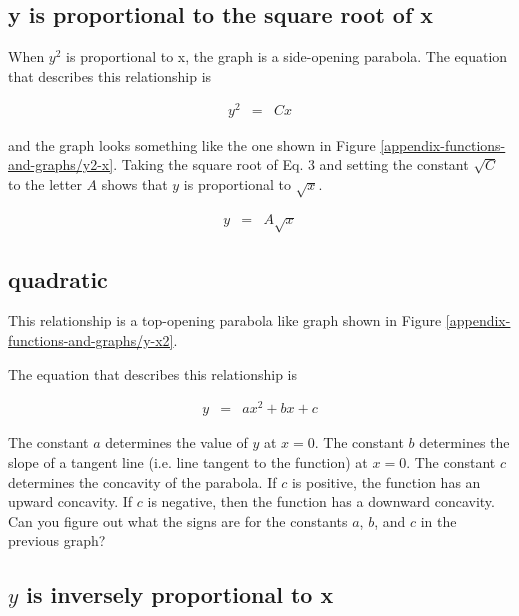 \subsection*{y is proportional to the square root of x}

When $y^2$ is proportional to x, the graph is a side-opening parabola.  The equation that describes this relationship is

\begin{eqnarray*}
	 y^2 & = & Cx
\end{eqnarray*}	 
 
and the graph looks something like the one shown in Figure \ref{appendix-functions-and-graphs/y2-x}. Taking the square root of Eq. 3  and setting the constant $\sqrt{C}$ to the letter $A$ shows that $y$ is proportional to $\sqrt{x}$.

\begin{eqnarray*}
	 y& = & A\sqrt{x}
\end{eqnarray*}	



\subsection*{quadratic}

This relationship is a top-opening parabola like graph shown in Figure \ref{appendix-functions-and-graphs/y-x2}.



 
The equation that describes this relationship is

\begin{eqnarray*}
	 y & = &  ax^2+bx+c
\end{eqnarray*}	 

The constant $a$ determines the value of $y$ at $x =0$. The constant $b$ determines the slope of a tangent line (i.e. line tangent to the function) at $x=0$. The constant $c$ determines the concavity of the parabola.  If $c$ is positive, the function has an upward concavity. If $c$ is negative, then the function has a downward concavity.  Can you figure out what the signs are for the constants $a$, $b$, and $c$ in the previous graph?

\subsection*{$y$ is inversely proportional to x}

